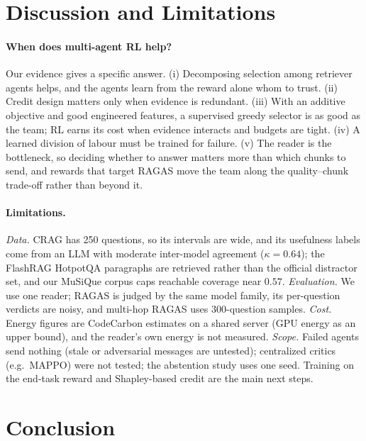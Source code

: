 \documentclass[sigconf,anonymous]{aamas}
\theoremstyle{plain}
\theoremstyle{definition}
\begin{document}


\section{Discussion and Limitations}

\paragraph{When does multi-agent RL help?}
Our evidence gives a specific answer. (i) Decomposing selection among retriever agents helps, and the agents learn from the reward alone whom to trust. (ii) Credit design matters only when evidence is redundant. (iii) With an additive objective and good engineered features, a supervised greedy selector is as good as the team; RL earns its cost when evidence interacts and budgets are tight. (iv) A learned division of labour must be trained for failure. (v) The reader is the bottleneck, so deciding whether to answer matters more than which chunks to send, and rewards that target RAGAS move the team along the quality--chunk trade-off rather than beyond it.

\paragraph{Limitations.}
\emph{Data.} CRAG has 250 questions, so its intervals are wide, and its usefulness labels come from an LLM with moderate inter-model agreement ($\kappa=0.64$); the FlashRAG HotpotQA paragraphs are retrieved rather than the official distractor set, and our MuSiQue corpus caps reachable coverage near $0.57$. \emph{Evaluation.} We use one reader; RAGAS is judged by the same model family, its per-question verdicts are noisy, and multi-hop RAGAS uses 300-question samples. \emph{Cost.} Energy figures are CodeCarbon estimates on a shared server (GPU energy as an upper bound), and the reader's own energy is not measured. \emph{Scope.} Failed agents send nothing (stale or adversarial messages are untested); centralized critics (e.g.\ MAPPO) were not tested; the abstention study uses one seed. Training on the end-task reward and Shapley-based credit are the main next steps.

\section{Conclusion}
\end{document}
